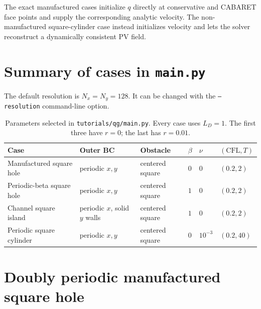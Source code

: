 \documentclass[11pt]{article}
\begin{document}
The exact manufactured cases initialize $q$ directly at conservative and
CABARET face points and supply the corresponding analytic velocity.  The
non-manufactured square-cylinder case instead initializes velocity and lets
the solver reconstruct a dynamically consistent PV field.

\section{Summary of cases in \texttt{main.py}}

The default resolution is $N_x=N_y=128$.  It can be changed with the
\texttt{--resolution} command-line option.

\begin{table}[ht]
  \centering
  \small
  \begin{tabular}{@{}llllll@{}}
    \toprule
    Case & Outer BC & Obstacle & $\beta$ & $\nu$ & $(\mathrm{CFL},T)$ \\
    \midrule
    Manufactured square hole & periodic $x,y$ & centered square
      & $0$ & $0$ & $(0.2,2)$ \\
    Periodic-beta square hole & periodic $x,y$ & centered square
      & $1$ & $0$ & $(0.2,2)$ \\
    Channel square island & periodic $x$, solid $y$ walls & centered square
      & $1$ & $0$ & $(0.2,2)$ \\
    Periodic square cylinder & periodic $x,y$ & centered square
      & $0$ & $10^{-3}$ & $(0.2,40)$ \\
    \bottomrule
  \end{tabular}
  \caption{Parameters selected in \texttt{tutorials/qg/main.py}.  Every
  case uses $L_D=1$.  The first three have $r=0$; the last has $r=0.01$.}
  \label{tab:cases}
\end{table}

\section{Doubly periodic manufactured square hole}
\label{sec:manufactured-hole}
\end{document}
